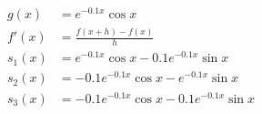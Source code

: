 \documentclass{article}
\begin{document}
\begin{equation}
\begin{split}
g(x) & = e^{-0.1x} \cos x\\
f'(x) &= \frac{f(x+h) - f(x)}{h}\\
s_1(x) &= e^{-0.1x} \cos x - 0.1e^{-0.1x} \sin x\\
s_2(x) &= -0.1e^{-0.1x} \cos x - e^{-0.1x} \sin x\\
s_3(x) &= -0.1e^{-0.1x} \cos x - 0.1e^{-0.1x} \sin x\\
\end{split}
\end{equation}
\end{document}
